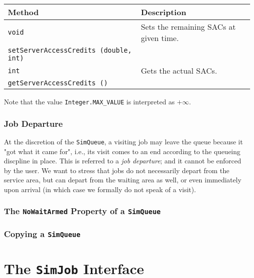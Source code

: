 \documentclass[12pt]{book}
\begin{document}
\begin{tabular}{|l|l|}
  \hline
  {\bf Method} & {\bf Description} \\
  \hline
  \lstinline[basicstyle=\footnotesize]!void!
    & Sets the remaining SACs at given time.
    \\
  \lstinline[basicstyle=\footnotesize]!setServerAccessCredits (double, int)!
    &
    \\ \hline
  \lstinline[basicstyle=\footnotesize]!int!
    & Gets the actual SACs.
    \\
  \lstinline[basicstyle=\footnotesize]!getServerAccessCredits ()!
    &
    \\ \hline
\end{tabular}

Note that the value \lstinline-Integer.MAX_VALUE- is interpreted as $+\infty$.

\subsubsection{Job Departure}

At the discretion of the \lstinline|SimQueue|,
  a visiting job may leave the queue
  because it "got what it came for",
  i.e.,
  its visit comes to an end
  according to the queueing discpline in place.
This is referred to a {\em job departure\/};
  and it cannot be enforced by the user.
We want to stress that jobs do not necessarily
  depart from the service area,
  but can depart from the waiting area as well,
  or even immediately upon arrival
  (in which case we formally do not speak of a visit).

\subsubsection{The \lstinline|NoWaitArmed| Property of a \lstinline|SimQueue|}

\subsubsection{Copying a \lstinline|SimQueue|}

\section{The \lstinline|SimJob| Interface}
\end{document}
